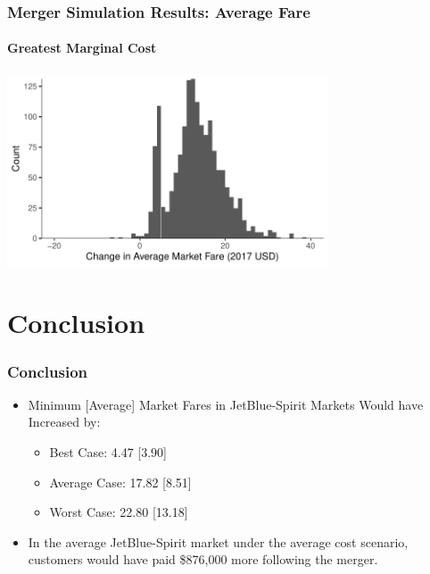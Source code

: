 \documentclass[xcolor=dvipsnames]{beamer}
\begin{document}
       	\begin{frame}
       		\frametitle{Merger Simulation Results: Average Fare}
       		\framesubtitle{Greatest Marginal Cost}
       	\includegraphics[width = 3.75in]{Merger_Change_AverageFare_WorstCase.pdf}
       	\end{frame}	
       	
	\section{Conclusion}
	\begin{frame}
		\frametitle{Conclusion}
		\begin{itemize}
			\item Minimum [Average] Market Fares in JetBlue-Spirit Markets Would have Increased by:
			\begin{itemize}
				\item Best Case: 4.47 [3.90]
				\item Average Case: 17.82 [8.51]
				\item Worst Case: 22.80 [13.18]
			\end{itemize}
			\item In the average JetBlue-Spirit market under the average cost scenario, customers would have paid \$876,000 more following the merger. 
		\end{itemize}
	\end{frame}

	
	
	
	
\end{document}
